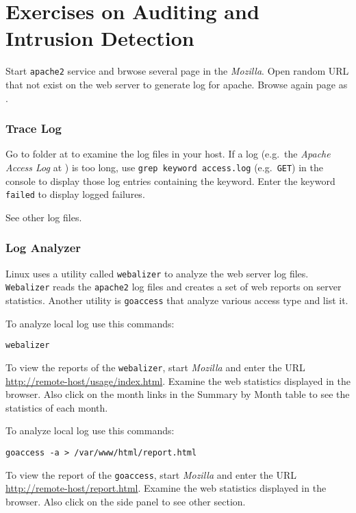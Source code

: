 \documentclass{../UTNetLab}
\begin{document}
\part{Exercises on Auditing and Intrusion Detection}
    Start \lstinline{apache2} service and brwose several page in the \textit{Mozilla}. Open random URL that not exist on the web server to generate log for apache. Browse again page as .

\section{Trace Log}
    Go to  folder at  to examine the log files in your host. If a log (e.g.\ the \textit{Apache Access Log} at ) is too long, use \lstinline[emph={keyword}]{grep keyword access.log} (e.g.\ \texttt{GET}) in the {console} to display those log entries containing the keyword. Enter the keyword \texttt{failed} to display logged failures.

    See other log files.

\section{Log Analyzer}
    Linux uses a utility called \lstinline{webalizer} to analyze the web server log files. \lstinline{Webalizer} reads the \lstinline{apache2} log files and creates a set of web reports on server statistics. Another utility is \lstinline{goaccess} that analyze various access type and list it.

    To analyze local log use this commands:
    \begin{lstlisting}
webalizer
    \end{lstlisting}
    
    To view the reports of the \lstinline{webalizer}, start \textit{Mozilla} and enter the URL \url{http://remote-host/usage/index.html}. Examine the web statistics displayed in the browser. Also click on the month links in the Summary by Month table to see the statistics of each month.

    To analyze local log use this commands:
    \begin{lstlisting}
goaccess -a > /var/www/html/report.html
    \end{lstlisting}
    
    To view the report of the \lstinline{goaccess}, start \textit{Mozilla} and enter the URL \url{http://remote-host/report.html}. Examine the web statistics displayed in the browser. Also click on the side panel to see other section.
\end{document}
